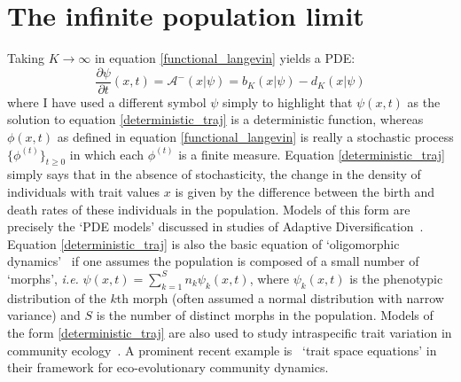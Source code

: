 \section{The infinite population limit}
Taking $K \to \infty$ in equation \eqref{functional_langevin} yields a PDE:
\begin{equation}
\label{deterministic_traj}
\frac{\partial \psi}{\partial t}(x,t) = \mathcal{A}^{-}\left(x|\psi\right) = b_K(x|\psi)- d_K(x|\psi)
\end{equation}
where I have used a different symbol $\psi$ simply to highlight that $\psi(x,t)$ as the solution to equation \eqref{deterministic_traj} is a deterministic function, whereas $\phi(x,t)$ as defined in equation \eqref{functional_langevin} is really a stochastic process $\{\phi^{(t)}\}_{t\geq0}$ in which each $\phi^{(t)}$ is a finite measure. Equation \eqref{deterministic_traj} simply says that in the absence of stochasticity, the change in the density of individuals with trait values $x$ is given by the difference between the birth and death rates of these individuals in the population. Models of this form are precisely the `PDE models' discussed in studies of Adaptive Diversification~\citep{doebeli_adaptive_2011}. Equation \eqref{deterministic_traj} is also the basic equation of `oligomorphic dynamics'~\citep{sasaki_oligomorphic_2011, lion_multimorph_2022} if one assumes the population is composed of a small number of `morphs', \emph{i.e.} $\psi(x,t) = \sum\limits_{k=1}^{S} n_{k}\psi_k(x,t)$, where $\psi_k(x,t)$ is the phenotypic distribution of the $k$th morph (often assumed a normal distribution with narrow variance) and $S$ is the number of distinct morphs in the population. Models of the form \eqref{deterministic_traj} are also used to study intraspecific trait variation in community ecology~\citep{nordbotten_dynamics_2020}. A prominent recent example is~ `trait space equations' in their framework for eco-evolutionary community dynamics.

